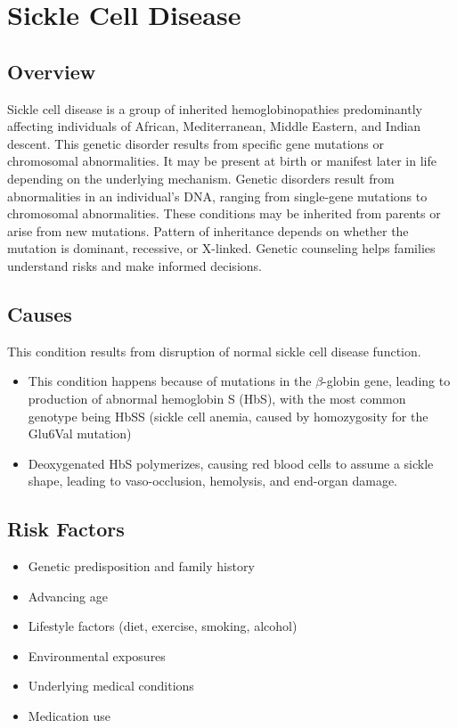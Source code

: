 \chapter{Sickle Cell Disease}
\label{sec:Sickle Cell Disease}

\section{Overview}
Sickle cell disease is a group of inherited hemoglobinopathies predominantly affecting individuals of African, Mediterranean, Middle Eastern, and Indian descent. This genetic disorder results from specific gene mutations or chromosomal abnormalities. It may be present at birth or manifest later in life depending on the underlying mechanism. Genetic disorders result from abnormalities in an individual's DNA, ranging from single-gene mutations to chromosomal abnormalities. These conditions may be inherited from parents or arise from new mutations. Pattern of inheritance depends on whether the mutation is dominant, recessive, or X-linked. Genetic counseling helps families understand risks and make informed decisions.
\section{Causes}
This condition results from disruption of normal sickle cell disease function.

\begin{itemize}[noitemsep]
  \item This condition happens because of mutations in the $\beta$-globin gene, leading to production of abnormal hemoglobin S (HbS), with the most common genotype being HbSS (sickle cell anemia, caused by homozygosity for the Glu6Val mutation)
  \item Deoxygenated HbS polymerizes, causing red blood cells to assume a sickle shape, leading to vaso-occlusion, hemolysis, and end-organ damage.
\end{itemize}
\section{Risk Factors}


\begin{itemize}[noitemsep]
  \item Genetic predisposition and family history
  \item Advancing age
  \item Lifestyle factors (diet, exercise, smoking, alcohol)
  \item Environmental exposures
  \item Underlying medical conditions
  \item Medication use
\end{itemize}
